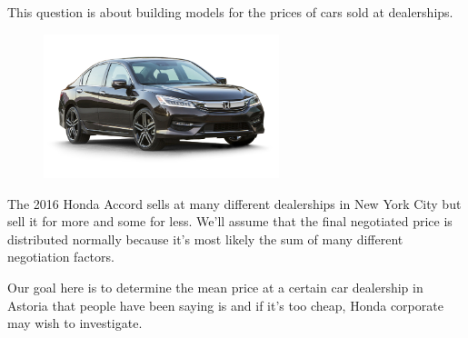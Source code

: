 \documentclass[12pt]{article}
\begin{document}
\problem This question is about building models for the prices of cars sold at dealerships.

\begin{figure}[htp]
\centering
\includegraphics[width=2.7in]{accord.jpg}
\end{figure}

The 2016 Honda Accord sells at many different dealerships in New York City but sell it for more and some for less. We'll assume that the final negotiated price is distributed normally because it's most likely the sum of many different negotiation factors.

Our goal here is to determine the mean price at a certain car dealership in Astoria that people have been saying is  and if it's too cheap, Honda corporate may wish to investigate.
\end{document}
